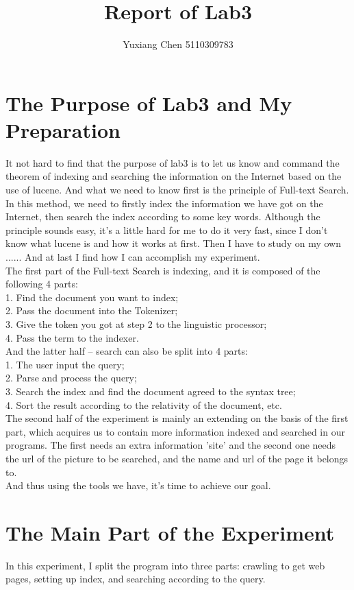 \documentclass{article}
\author{Yuxiang Chen 5110309783}
\title{Report of Lab3}
\begin{document}
\maketitle
\tableofcontents
\section{The Purpose of Lab3 and My Preparation}
It not hard to find that the purpose of lab3 is to let us know and command the theorem of indexing and searching the information on the Internet based on the use of lucene. And what we need to know first is the principle of Full-text Search. In this method, we need to firstly index the information we have got on the Internet, then search the index according to some key words. Although the principle sounds easy, it's a little hard for me to do it very fast, since I don't know what lucene is and how it works at first. Then I have to study on my own ...... And at last I find how I can accomplish my experiment.\\
The first part of the Full-text Search is indexing, and it is composed of the following 4 parts:\\
1. Find the document you want to index;\\
2. Pass the document into the Tokenizer;\\
3. Give the token you got at step 2 to the linguistic processor;\\
4. Pass the term to the indexer.\\
And the latter half -- search can also be split into 4 parts:\\
1. The user input the query;\\
2. Parse and process the query;\\
3. Search the index and find the document agreed to the syntax tree;\\
4. Sort the result according to the relativity of the document, etc.\\
The second half of the experiment is mainly an extending on the basis of the first part, which acquires us to contain more information indexed and searched in our programs. The first needs an extra information 'site' and the second one needs the url of the picture to be searched, and the name and url of the page it belongs to.\\
And thus using the tools we have, it's time to achieve our goal.\\
\section{The Main Part of the Experiment}
In this experiment, I split the program into three parts: crawling to get web pages, setting up index, and searching according to the query.\\
\end{document}
